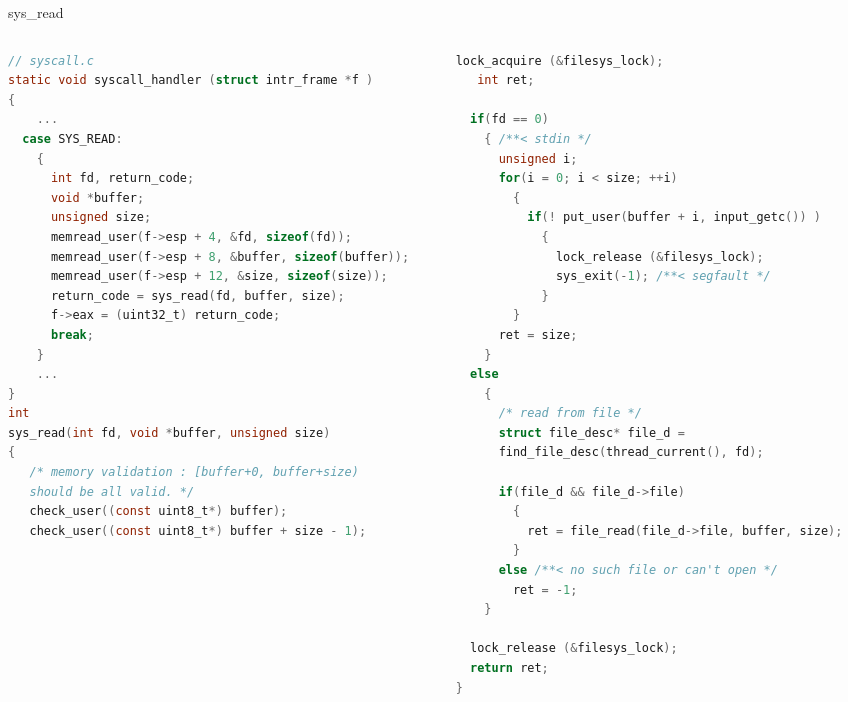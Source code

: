 \documentclass[10pt]{beamer}
\begin{document}
\begin{frame}[fragile]{sys\_read}
\begin{columns}
\begin{column}{0.5\textwidth}
\begin{lstlisting}[language=C]
// syscall.c
static void syscall_handler (struct intr_frame *f ) 
{
    ...
  case SYS_READ:
    {
      int fd, return_code;
      void *buffer;
      unsigned size;
      memread_user(f->esp + 4, &fd, sizeof(fd));
      memread_user(f->esp + 8, &buffer, sizeof(buffer));
      memread_user(f->esp + 12, &size, sizeof(size));
      return_code = sys_read(fd, buffer, size);
      f->eax = (uint32_t) return_code;
      break;
    }
    ...
}
int 
sys_read(int fd, void *buffer, unsigned size) 
{
   /* memory validation : [buffer+0, buffer+size) 
   should be all valid. */
   check_user((const uint8_t*) buffer);
   check_user((const uint8_t*) buffer + size - 1);
\end{lstlisting}
\end{column}
\begin{column}{0.5\textwidth}
\begin{lstlisting}[language=C]
   lock_acquire (&filesys_lock);
   int ret;

  if(fd == 0) 
    { /**< stdin */
      unsigned i;
      for(i = 0; i < size; ++i) 
        {
          if(! put_user(buffer + i, input_getc()) ) 
            {
              lock_release (&filesys_lock);
              sys_exit(-1); /**< segfault */
            }
        }
      ret = size;
    }
  else 
    {
      /* read from file */
      struct file_desc* file_d = 
      find_file_desc(thread_current(), fd);

      if(file_d && file_d->file) 
        {
          ret = file_read(file_d->file, buffer, size);
        }
      else /**< no such file or can't open */
        ret = -1;
    }

  lock_release (&filesys_lock);
  return ret;
}
    \end{lstlisting}
\end{column}
\end{columns}
\end{frame}
\end{document}
